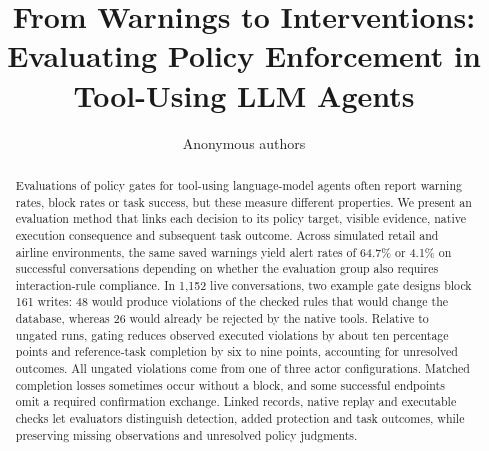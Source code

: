 \documentclass[10pt]{article}
\title{From Warnings to Interventions:\\Evaluating Policy Enforcement in Tool-Using LLM Agents}
\author{Anonymous authors}
\begin{document}
\maketitle
\begin{abstract}
Evaluations of policy gates for tool-using language-model agents often
report warning rates, block rates or task success, but these measure
different properties. We present an evaluation method that links each
decision to its policy target, visible evidence, native execution
consequence and subsequent task outcome. Across simulated retail and
airline environments, the same saved warnings yield alert rates of
64.7\% or 4.1\% on successful conversations depending on whether the
evaluation group also requires interaction-rule compliance. In 1,152
live conversations, two example gate designs block 161 writes: 48 would
produce violations of the checked rules that would change the database,
whereas 26 would already be rejected by the native tools. Relative to
ungated runs, gating reduces observed executed violations by about ten
percentage points and reference-task completion by six to nine points,
accounting for unresolved outcomes. All ungated violations come from one
of three actor configurations. Matched completion losses sometimes occur
without a block, and some successful endpoints omit a required
confirmation exchange. Linked records, native replay and executable
checks let evaluators distinguish detection, added protection and task
outcomes, while preserving missing observations and unresolved policy
judgments.
\end{abstract}



\clearpage
\appendix

\end{document}
